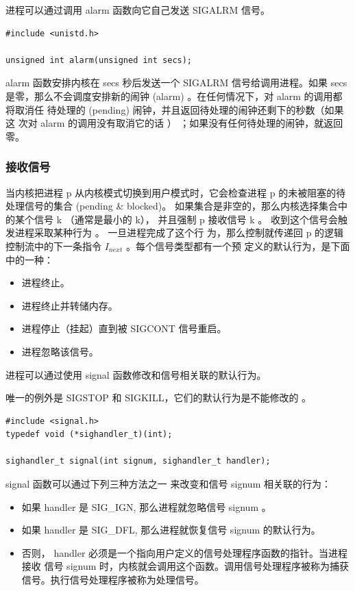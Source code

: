 进程可以通过调用 alarm 函数向它自己发送 SIGALRM 信号。

\begin{lstlisting}[style=CStyle]
#include <unistd.h>

unsigned int alarm(unsigned int secs);
\end{lstlisting}

alarm 函数安排内核在 secs 秒后发送一个 SIGALRM 信号给调用进程。如果 secs
是零，那么不会调度安排新的闹钟 (alarm) 。在任何情况下，对 alarm 的调用都将取消任
待处理的 (pending) 闹钟，并且返回待处理的闹钟还剩下的秒数（如果这
次对 alarm 的调用没有取消它的话 ） ；如果没有任何待处理的闹钟，就返回零。

\subsubsection{接收信号}

当内核把进程 p 从内核模式切换到用户模式时，它会检查进程 p 的未被阻塞的待处理信号的集合 (pending \& blocked)。
如果集合是非空的，那么内核选择集合中的某个信号 k （通常是最小的 k），
并且强制 p 接收信号 k 。 收到这个信号会触发进程采取某种行为 。 一旦进程完成了这个行
为，那么控制就传递回 p 的逻辑控制流中的下一条指令 $I_{next}$ 。每个信号类型都有一个预
定义的默认行为，是下面中的一种：

\begin{itemize}
    \item 进程终止。
    \item 进程终止并转储内存。
    \item 进程停止（挂起）直到被 SIGCONT 信号重启。
    \item 进程忽略该信号。
\end{itemize}

进程可以通过使用 signal 函数修改和信号相关联的默认行为。

唯一的例外是 SIGSTOP 和 SIGKILL，它们的默认行为是不能修改的 。

\begin{lstlisting}[style=CStyle]
#include <signal.h>
typedef void (*sighandler_t)(int);

sighandler_t signal(int signum, sighandler_t handler);
\end{lstlisting}

signal 函数可以通过下列三种方法之一 来改变和信号 signum 相关联的行为：
\begin{itemize}
    \item 如果 handler 是 SIG\_IGN, 那么进程就忽略信号 signum 。
    \item 如果 handler 是 SIG\_DFL, 那么进程就恢复信号 signum 的默认行为。
    \item 否则， handler 必须是一个指向用户定义的信号处理程序函数的指针。当进程接收
          信号 signum 时，内核就会调用这个函数。调用信号处理程序被称为捕获信号。执行信号处理程序被称为处理信号。
\end{itemize}

